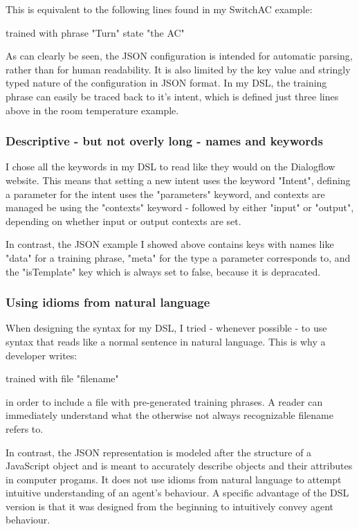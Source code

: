This is equivalent to the following lines found in my SwitchAC example:
\begin{DSL}
    trained with phrase
        "Turn" state "the AC"
\end{DSL}
As can clearly be seen, the JSON configuration is intended for automatic parsing, rather than for human readability. It is also limited by the key value and stringly typed nature of the configuration in JSON format. In my DSL, the training phrase can easily be traced back to it's intent, which is defined just three lines above in the room temperature example.

\subsubsection{Descriptive - but not overly long - names and keywords}

I chose all the keywords in my DSL to read like they would on the Dialogflow website.
This means that setting a new intent uses the keyword "Intent", defining a parameter for the intent uses the "parameters" keyword, and contexts are managed be using the "contexts" keyword - followed by either "input" or "output", depending on whether input or output contexts are set.

In contrast, the JSON example I showed above contains keys with names like "data" for a training phrase, "meta" for the type a parameter corresponds to, and the "isTemplate" key which is always set to false, because it is depracated.

\subsubsection{Using idioms from natural language}

When designing the syntax for my DSL, I tried - whenever possible - to use syntax that reads like a normal sentence in natural language. This is why a developer writes: 
\begin{DSL}
    trained with file
        "filename"
\end{DSL}
in order to include a file with pre-generated training phrases. A reader can immediately understand what the otherwise not always recognizable filename refers to.

In contrast, the JSON representation is modeled after the structure of a JavaScript object and is meant to accurately describe objects and their attributes in computer progams. It does not use idioms from natural language to attempt intuitive understanding of an agent's behaviour.
A specific advantage of the DSL version is that it was designed from the beginning to intuitively convey agent behaviour.

